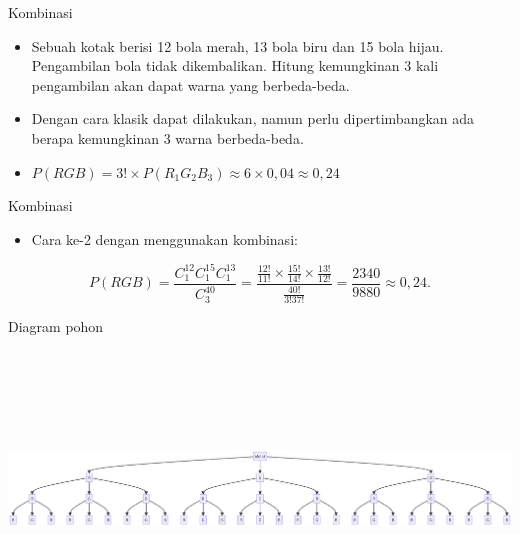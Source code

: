 \documentclass[
  ignorenonframetext,
]{beamer}
\providecommand{\tightlist}{%
  \setlength{\itemsep}{0pt}\setlength{\parskip}{0pt}}\usepackage{longtable,booktabs,array}
\begin{document}
\begin{frame}{Kombinasi}
\label{kombinasi-1}
\begin{itemize}
\item
  Sebuah kotak berisi 12 bola merah, 13 bola biru dan 15 bola hijau.
  Pengambilan bola tidak dikembalikan. Hitung kemungkinan 3 kali
  pengambilan akan dapat warna yang berbeda-beda.
\item
  Dengan cara klasik dapat dilakukan, namun perlu dipertimbangkan ada
  berapa kemungkinan 3 warna berbeda-beda.
\item
  \(P(RGB)=3! \times P(R_1G_2B_3)\approx6\times0,04\approx0,24\)
\end{itemize}
\end{frame}

\begin{frame}{Kombinasi}
\label{kombinasi-2}
\begin{itemize}
\tightlist
\item
  Cara ke-2 dengan menggunakan kombinasi:
\end{itemize}

\[
P(RGB)=\frac{C^{12}_1C^{15}_1C^{13}_1}{C^{40}_3}=\frac{\frac{12!}{11!}\times\frac{15!}{14!}\times\frac{13!}{12!}}{\frac{40!}{3!37!}}=\frac{2340}{9880}\approx0,24.
\]
\end{frame}

\begin{frame}{Diagram pohon}
\label{diagram-pohon}
\includegraphics[width=20.66in,height=3.15in]{index_files/figure-beamer/mermaid-figure-1.png}
\end{frame}
\end{document}
